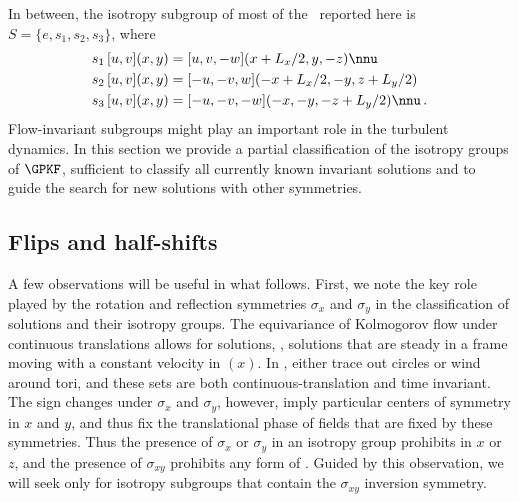 In between, the isotropy subgroup  of most
of the \eqva\ reported here is $S = \{e, s_1, s_2, s_3\}$, where
\begin{align}
s_1 \, [u,v](x,y) &= [u, v, -w](x+L_x/2, y, -z) \nnu \\
s_2 \, [u,v](x,y) &= [-u, -v, w](-x+L_x/2,-y,z+L_y/2) \label{shiftRot}\\
s_3 \, [u,v](x,y) &= [-u,-v,-w](-x, -y, -z+L_y/2) \nnu
\,.
\end{align}
Flow-invariant subgroups might play an important role in the turbulent
dynamics. In this section we provide a partial classification of the
isotropy groups of $\GPKF$, sufficient to classify all currently known
invariant solutions and to guide the search for new solutions with other
symmetries.


\subsection{Flips and half-shifts}
\label{s:flipnshift}

A few observations will be useful in what follows. First, we note the
key role played by the {rotation and reflection} symmetries $\sigma_x$
and $\sigma_y$  in the classification of solutions and
their isotropy groups. The equivariance of Kolmogorov flow under
continuous translations allows for {\reqva} solutions, \ie,
solutions that are steady in a frame moving with a constant velocity
in $(x)$. In {\statesp}, {\reqva} either trace out
circles or wind around tori, and these sets are both
continuous-translation and time invariant. The sign changes under
$\sigma_x$ and $\sigma_{y}$, however, imply particular
centers of symmetry in $x$ and $y$,
and thus fix the translational phase of fields that are fixed by these
symmetries. Thus the presence of $\sigma_x$ or $\sigma_y$ in an
isotropy group prohibits {\reqva} in $x$ or $z$, and the
presence of $\sigma_{xy}$ prohibits any form of {\reqv}. Guided
by this observation, we will seek {\eqva} only for isotropy subgroups
that contain the $\sigma_{xy}$ inversion symmetry.

